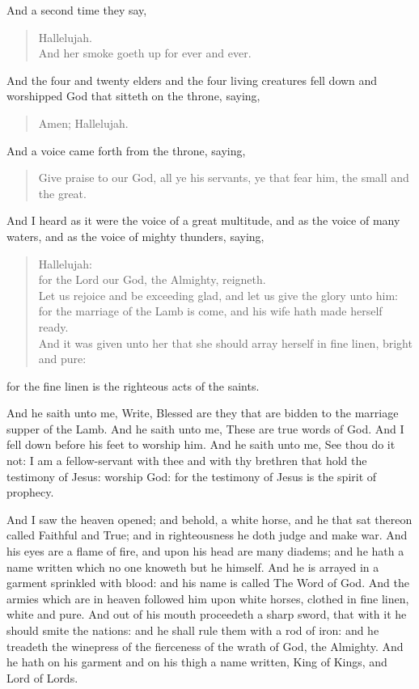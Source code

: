 \noindent
{} And a second time they say,
\begin{verse}
Hallelujah.\\
And her smoke goeth up for ever and ever.%
\end{verse}
 And the four and twenty elders and the four living creatures fell down and worshipped God that sitteth on the throne, saying, 
\begin{verse}
Amen; Hallelujah. 
\end{verse}
 And a voice came forth from the throne, saying,
\begin{verse}
Give praise to our God, all ye his servants, ye that fear him, the small and the great.
\end{verse}
 And I heard as it were the voice of a great multitude, and as the voice of many waters, and as the voice of mighty thunders, saying,
\begin{verse}
Hallelujah:\\
for the Lord our God, the Almighty, reigneth.\\
Let us rejoice and be exceeding glad, and let us give the glory unto him:\\
for the marriage of the Lamb is come, and his wife hath made herself ready.\\
And it was given unto her that she should array herself in fine linen, bright and pure:
\end{verse}
for the fine linen is the righteous acts of the saints.

 And he saith unto me, Write, Blessed are they that are bidden to the marriage supper of the Lamb. And he saith unto me, These are true words of God. 
 And I fell down before his feet to worship him. And he saith unto me, See thou do it not: I am a fellow-servant with thee and with thy brethren that hold the testimony of Jesus: worship God: for the testimony of Jesus is the spirit of prophecy.

 And I saw the heaven opened; and behold, a white horse, and he that sat thereon called Faithful and True; and in righteousness he doth judge and make war. 
 And his eyes are a flame of fire, and upon his head are many diadems; and he hath a name written which no one knoweth but he himself. 
 And he is arrayed in a garment sprinkled with blood: and his name is called The Word of God. 
 And the armies which are in heaven followed him upon white horses, clothed in fine linen, white and pure. 
 And out of his mouth proceedeth a sharp sword, that with it he should smite the nations: and he shall rule them with a rod of iron: and he treadeth the winepress of the fierceness of the wrath of God, the Almighty. 
 And he hath on his garment and on his thigh a name written, King of Kings, and Lord of Lords.

